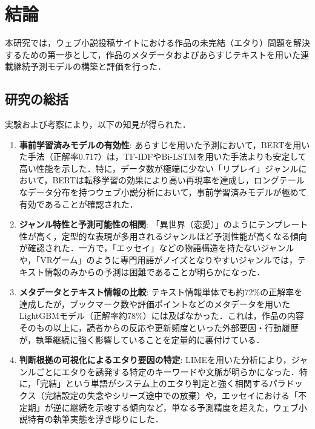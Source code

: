 \documentclass[uplatex, dvipdfmx, 11pt, a4paper, report]{jsbook}
\begin{document}


\chapter{結論}

本研究では，ウェブ小説投稿サイトにおける作品の未完結（エタり）問題を解決するための第一歩として，作品のメタデータおよびあらすじテキストを用いた連載継続予測モデルの構築と評価を行った．

\section{研究の総括}
実験および考察により，以下の知見が得られた．

\begin{enumerate}
    \item \textbf{事前学習済みモデルの有効性}: 
    あらすじを用いた予測において，BERTを用いた手法（正解率0.717）は，TF-IDFやBi-LSTMを用いた手法よりも安定して高い性能を示した．特に，データ数が極端に少ない「リプレイ」ジャンルにおいて，BERTは転移学習の効果により高い再現率を達成し，ロングテールなデータ分布を持つウェブ小説分析において，事前学習済みモデルが極めて有効であることが確認された．
    
    \item \textbf{ジャンル特性と予測可能性の相関}: 
    「異世界（恋愛）」のようにテンプレート性が高く，定型的な表現が多用されるジャンルほど予測性能が高くなる傾向が確認された．一方で，「エッセイ」などの物語構造を持たないジャンルや，「VRゲーム」のように専門用語がノイズとなりやすいジャンルでは，テキスト情報のみからの予測は困難であることが明らかになった．
    
    \item \textbf{メタデータとテキスト情報の比較}: 
    テキスト情報単体でも約72\%の正解率を達成したが，ブックマーク数や評価ポイントなどのメタデータを用いたLightGBMモデル（正解率約78\%）には及ばなかった．これは，作品の内容そのもの以上に，読者からの反応や更新頻度といった外部要因・行動履歴が，執筆継続に強く影響していることを定量的に裏付けている．

    \item \textbf{判断根拠の可視化によるエタり要因の特定}: 
    LIMEを用いた分析により，ジャンルごとにエタりを誘発する特定のキーワードや文脈が明らかになった．特に，「完結」という単語がシステム上のエタり判定と強く相関するパラドックス（完結設定の失念やシリーズ途中での放棄）や，エッセイにおける「不定期」が逆に継続を示唆する傾向など，単なる予測精度を超えた，ウェブ小説特有の執筆実態を浮き彫りにした．
\end{enumerate}
\end{document}
